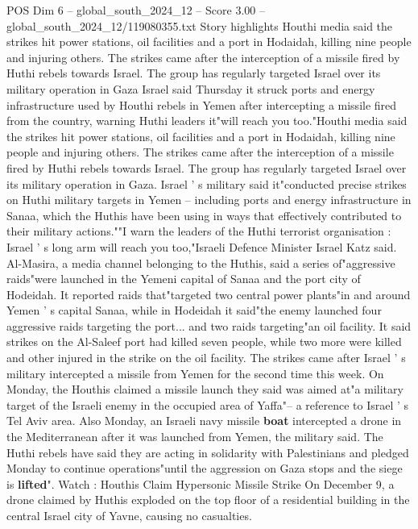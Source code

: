 \begin{textsample}{POS Dim 6 – global\_south\_2024\_12 – Score 3.00 – global\_south\_2024\_12/119080355.txt}  \label{ex:f6_pos_432}
Story highlights Houthi media said the strikes hit power stations, oil facilities and a port in Hodaidah, killing nine people and injuring others.
The strikes came after the interception of a missile fired by Huthi rebels towards Israel.
The group has regularly targeted Israel over its military operation in Gaza Israel said Thursday it struck ports and energy infrastructure used by Houthi rebels in Yemen after intercepting a missile fired from the country, warning Huthi leaders it"will reach you too."Houthi media said the strikes hit power stations, oil facilities and a port in Hodaidah, killing nine people and injuring others.
The strikes came after the interception of a missile fired by Huthi rebels towards Israel.
The group has regularly targeted Israel over its military operation in Gaza.
Israel ' s military said it"conducted precise strikes on Huthi military targets in Yemen -- including ports and energy infrastructure in Sanaa, which the Huthis have been using in ways that effectively contributed to their military actions.""I warn the leaders of the Huthi terrorist organisation : Israel ' s long arm will reach you too,"Israeli Defence Minister Israel Katz said.
Al-Masira, a media channel belonging to the Huthis, said a series of"aggressive raids"were launched in the Yemeni capital of Sanaa and the port city of Hodeidah.
It reported raids that"targeted two central power plants"in and around Yemen ' s capital Sanaa, while in Hodeidah it said"the enemy launched four aggressive raids targeting the port... and two raids targeting"an oil facility.
It said strikes on the Al-Saleef port had killed seven people, while two more were killed and other injured in the strike on the oil facility.
The strikes came after Israel ' s military intercepted a missile from Yemen for the second time this week.
On Monday, the Houthis claimed a missile launch they said was aimed at"a military target of the Israeli enemy in the occupied area of Yaffa"-- a reference to Israel ' s Tel Aviv area.
Also Monday, an Israeli navy missile \textbf{boat} intercepted a drone in the Mediterranean after it was launched from Yemen, the military said.
The Huthi rebels have said they are acting in solidarity with Palestinians and pledged Monday to continue operations"until the aggression on Gaza stops and the siege is \textbf{lifted}".
Watch : Houthis Claim Hypersonic Missile Strike On December 9, a drone claimed by Huthis exploded on the top floor of a residential building in the central Israel city of Yavne, causing no casualties.

\end{textsample}

